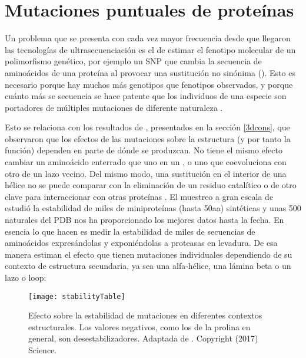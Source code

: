 \section{Mutaciones puntuales de prote\'{i}nas} \label{pointmut}

Un problema que se presenta con cada vez mayor frecuencia desde que llegaron las tecnolog\'{i}as de 
ultrasecuenciaci\'{o}n es el de estimar el fenotipo molecular de un polimorfismo gen\'{e}tico, 
por ejemplo un SNP que cambia la secuencia de amino\'{a}cidos de una prote\'{i}na al provocar 
una sustituci\'{o}n no sin\'{o}nima (). 
Esto es necesario porque hay muchos m\'{a}s genotipos que fenotipos observados, y porque cu\'{a}nto m\'{a}s se secuencia se hace
patente que los individuos de una especie son portadores de m\'{u}ltiples mutaciones de diferente naturaleza
\citep{Peterson2013}.

Esto se relaciona con los resultados de \citet{Chothia1986}, presentados en la secci\'{o}n \ref{3dcons}, que 
observaron que los efectos de las mutaciones sobre la estructura (y por tanto la funci\'{o}n) dependen en
parte de d\'{o}nde se produzcan. No tiene el mismo efecto cambiar un amino\'{a}cido enterrado que uno en un
, o uno que coevoluciona con otro de un lazo vecino. Del mismo modo, una sustituci\'{o}n en el interior
de una h\'{e}lice no se puede comparar con la eliminaci\'{o}n de un residuo catal\'{i}tico \citep{Berrondo2011}
o de otro clave para interaccionar con otras prote\'{i}nas \citep{deJuan2013}. 
El muestreo a gran escala de \citet{Rocklin2017} estudi\'{o} la estabilidad de miles de miniprote\'{i}nas (hasta 50aa) sint\'{e}ticas 
y unas 500 naturales del PDB nos ha proporcionado los mejores datos hasta la fecha. En esencia lo que hacen es medir la estabilidad 
de miles de secuencias de amino\'{a}cidos expres\'{a}ndolas y exponi\'{e}ndolas a proteasas en levadura.
De esa manera estiman el efecto que tienen mutaciones individuales dependiendo de su contexto de estructura secundaria, 
ya sea una alfa-h\'{e}lice, una l\'{a}mina beta o un lazo o loop:

\begin{figure}
\begin{center} 
\texttt{[image: stabilityTable]}
\caption%
{
Efecto sobre la estabilidad de mutaciones en diferentes contextos estructurales. 
Los valores negativos, como los de la prolina en general, son desestabilizadores. 
Adaptada de \citet{Rocklin2017}. Copyright (2017) Science.
}
\label{fig:miniprotstab} %
\end{center}
\end{figure}

